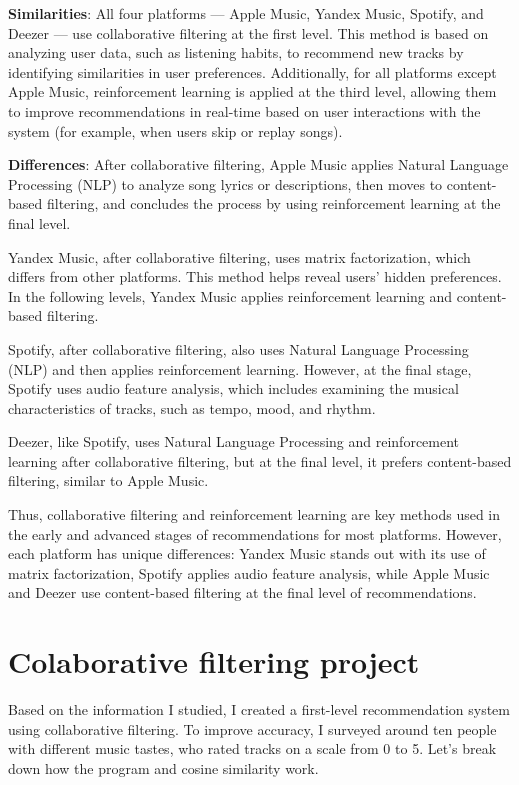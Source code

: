 \documentclass[12pt,a4paper]{article}
\begin{document}
\textbf{Similarities}: All four platforms — Apple Music, Yandex Music, Spotify, and Deezer — use collaborative filtering at the first level. This method is based on analyzing user data, such as listening habits, to recommend new tracks by identifying similarities in user preferences. Additionally, for all platforms except Apple Music, reinforcement learning is applied at the third level, allowing them to improve recommendations in real-time based on user interactions with the system (for example, when users skip or replay songs).

\textbf{Differences}: After collaborative filtering, Apple Music applies Natural Language Processing (NLP) to analyze song lyrics or descriptions, then moves to content-based filtering, and concludes the process by using reinforcement learning at the final level.

Yandex Music, after collaborative filtering, uses matrix factorization, which differs from other platforms. This method helps reveal users' hidden preferences. In the following levels, Yandex Music applies reinforcement learning and content-based filtering.

Spotify, after collaborative filtering, also uses Natural Language Processing (NLP) and then applies reinforcement learning. However, at the final stage, Spotify uses audio feature analysis, which includes examining the musical characteristics of tracks, such as tempo, mood, and rhythm.

Deezer, like Spotify, uses Natural Language Processing and reinforcement learning after collaborative filtering, but at the final level, it prefers content-based filtering, similar to Apple Music.

Thus, collaborative filtering and reinforcement learning are key methods used in the early and advanced stages of recommendations for most platforms. However, each platform has unique differences: Yandex Music stands out with its use of matrix factorization, Spotify applies audio feature analysis, while Apple Music and Deezer use content-based filtering at the final level of recommendations.

\section{Colaborative filtering project}

Based on the information I studied, I created a first-level recommendation system using collaborative filtering. To improve accuracy, I surveyed around ten people with different music tastes, who rated tracks on a scale from 0 to 5. Let's break down how the program and cosine similarity work.
\end{document}
